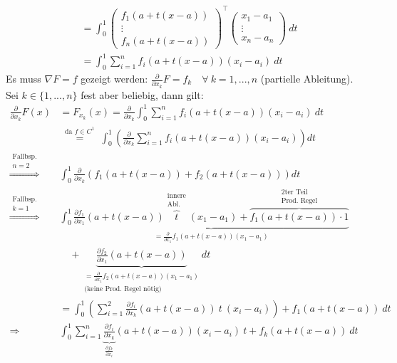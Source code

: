 \documentclass[11pt,a4paper]{book}
\newcommand{\1}    	{\mathbbm{1}}
\begin{document}
\begin{enumerate}[(i)]
\begin{align*}
		&= \int_0^1 \left( \begin{array}{c}
			f_1(a + t(x - a)) \\
			\vdots \\
			f_n(a + t(x - a))
		\end{array} \right)^\top
		\left( \begin{array}{c}
			x_1 - a_1 \\
			\vdots \\
			x_n - a_n
		\end{array} \right)
		~dt	\\
		&= \int_0^1 \sum_{i=1}^n f_i(a + t(x - a))(x_i - a_i) ~dt
	\end{align*}
	Es muss \(\nabla F = f\) gezeigt werden: \( \frac{\partial}{\partial x_k} F = f_k \quad \forall~ k = 1, ..., n\) (partielle Ableitung). Sei \(k \in \{ 1, ..., n\}\) fest aber beliebig, dann gilt:
	\begin{align*}
		\frac{\partial}{\partial x_k} F(x) &= F_{x_k}(x) =
		\frac{\partial}{\partial x_k} \int_0^1 \sum_{i=1}^n f_i(a + t(x - a))(x_i - a_i) ~dt \\
		&\stackrel{\substack{\textrm{da }f\in C^1}}{=}
		\int_0^1\left( \frac{\partial}{\partial x_k} \sum_{i=1}^n f_i(a + t(x - a))(x_i - a_i) \right) dt \\
		\stackrel{\substack{
			\textrm{Fallbsp.}\\
			n=2
		}}{\Rightarrow}\quad&
		\int_0^1 \frac{\partial}{\partial x_k}
		\left( f_1(a+t(x-a)) + f_2(a+t(x-a)) \right) dt \\
		\stackrel{\substack{
			\textrm{Fallbsp.}\\
			k=1
		}}{\Rightarrow}\quad&
		\int_0^1 \underbrace{
			\frac{\partial f_1}{\partial x_1} (a+t(x-a))
			\overbrace{t}^{\substack{\textrm{innere}\\\textrm{Abl.}}}
			(x_1 - a_1) + 
			\overbrace{f_1(a+t(x-a)) \cdot 1}^{\substack{\textrm{2ter Teil}\\\textrm{Prod. Regel}}}
		}_{= \frac{\partial}{\partial x_1} f_1(a+t(x-a))(x_1 - a_1) } \\
		&\quad + \underbrace{
			\frac{\partial f_2}{\partial x_1}(a+t(x-a))
		}_{\substack{
			= \frac{\partial}{\partial x_1} f_2(a+t(x-a))(x_1 - a_1)\\
			\textrm{(keine Prod. Regel nötig)}
		}} dt \\
		&= \int_0^1 \left(\sum_{i=1}^2 \frac{\partial f_i}{\partial x_k} (a+t(x-a))~t~(x_i-a_i)\right) + f_1(a+t(x-a)) ~dt \\
		\Rightarrow\quad& 
		\int_0^1 \sum_{i=1}^n \underbrace{\frac{\partial f_i}{\partial x_k}}_{\frac{\partial f_k}{\partial x_i}} (a+t(x-a))(x_i-a_i)~t + f_k(a+t(x-a)) ~dt \\

\end{align*}
\end{enumerate}
\end{document}
